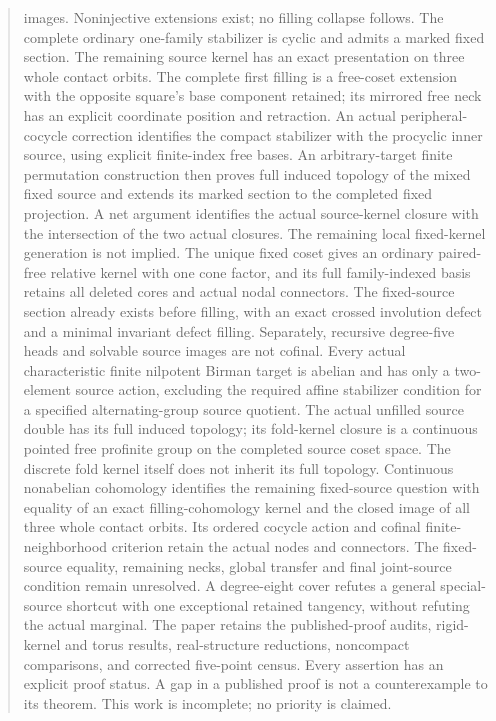 \documentclass[11pt,a4paper]{article}
\begin{document}
\begin{abstract}
images. Noninjective extensions exist; no filling collapse follows. The complete ordinary
one-family stabilizer is cyclic and admits a marked fixed section.
The remaining source kernel has an exact presentation on three whole
contact orbits. The complete first filling is a free-coset extension
with the opposite square's base component retained; its mirrored free
neck has an explicit coordinate position and retraction. An actual
peripheral-cocycle correction identifies the compact stabilizer with
the procyclic inner source, using explicit finite-index free bases.
An arbitrary-target finite permutation construction then proves full
induced topology of the mixed fixed source and extends its marked
section to the completed fixed projection. A net argument identifies
the actual source-kernel closure with the intersection of the two
actual closures. The remaining local fixed-kernel generation is not
implied.
The unique fixed coset gives an ordinary paired-free relative kernel
with one cone factor, and its full family-indexed basis retains all
deleted cores and actual nodal connectors. The fixed-source section
already exists before filling, with an exact crossed involution defect
and a minimal invariant defect filling. Separately, recursive degree-five
heads and solvable source images are not cofinal. Every actual
characteristic finite nilpotent Birman target is abelian and has only
a two-element source action, excluding the required affine stabilizer
condition for a specified alternating-group source quotient.
The actual unfilled source double has its full induced topology; its
fold-kernel closure is a continuous pointed free profinite group on
the completed source coset space. The discrete fold kernel itself
does not inherit its full topology. Continuous nonabelian cohomology
identifies the remaining fixed-source question with equality of an
exact filling-cohomology kernel and the closed image of all three
whole contact orbits. Its ordered cocycle action and cofinal
finite-neighborhood criterion retain the actual nodes and connectors.
The fixed-source equality, remaining necks, global transfer and final
joint-source condition remain unresolved. A degree-eight cover refutes
a general special-source shortcut with one exceptional retained
tangency, without refuting the actual marginal. The paper retains the published-proof audits, rigid-kernel
and torus results, real-structure reductions, noncompact comparisons,
and corrected five-point census. Every assertion has an explicit proof
status. A gap in a published proof is not a counterexample to its theorem.
This work is incomplete; no priority is claimed.
\end{abstract}
\tableofcontents
\clearpage
\end{document}
